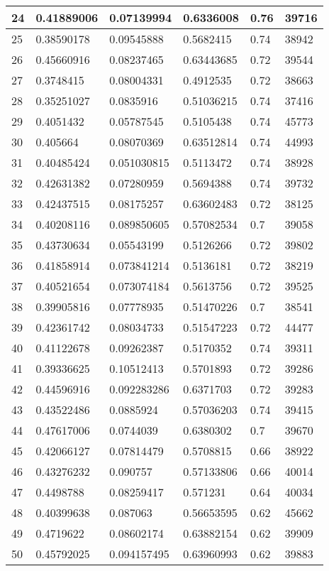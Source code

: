 \begin{longtable}{|l|l|l|l|l|l|}
24 & 0.41889006 & 0.07139994 & 0.6336008 & 0.76 & 39716 \\ \hline 
25 & 0.38590178 & 0.09545888 & 0.5682415 & 0.74 & 38942 \\ \hline 
26 & 0.45660916 & 0.08237465 & 0.63443685 & 0.72 & 39544 \\ \hline 
27 & 0.3748415 & 0.08004331 & 0.4912535 & 0.72 & 38663 \\ \hline 
28 & 0.35251027 & 0.0835916 & 0.51036215 & 0.74 & 37416 \\ \hline 
29 & 0.4051432 & 0.05787545 & 0.5105438 & 0.74 & 45773 \\ \hline 
30 & 0.405664 & 0.08070369 & 0.63512814 & 0.74 & 44993 \\ \hline 
31 & 0.40485424 & 0.051030815 & 0.5113472 & 0.74 & 38928 \\ \hline 
32 & 0.42631382 & 0.07280959 & 0.5694388 & 0.74 & 39732 \\ \hline 
33 & 0.42437515 & 0.08175257 & 0.63602483 & 0.72 & 38125 \\ \hline 
34 & 0.40208116 & 0.089850605 & 0.57082534 & 0.7 & 39058 \\ \hline 
35 & 0.43730634 & 0.05543199 & 0.5126266 & 0.72 & 39802 \\ \hline 
36 & 0.41858914 & 0.073841214 & 0.5136181 & 0.72 & 38219 \\ \hline 
37 & 0.40521654 & 0.073074184 & 0.5613756 & 0.72 & 39525 \\ \hline 
38 & 0.39905816 & 0.07778935 & 0.51470226 & 0.7 & 38541 \\ \hline 
39 & 0.42361742 & 0.08034733 & 0.51547223 & 0.72 & 44477 \\ \hline 
40 & 0.41122678 & 0.09262387 & 0.5170352 & 0.74 & 39311 \\ \hline 
41 & 0.39336625 & 0.10512413 & 0.5701893 & 0.72 & 39286 \\ \hline 
42 & 0.44596916 & 0.092283286 & 0.6371703 & 0.72 & 39283 \\ \hline 
43 & 0.43522486 & 0.0885924 & 0.57036203 & 0.74 & 39415 \\ \hline 
44 & 0.47617006 & 0.0744039 & 0.6380302 & 0.7 & 39670 \\ \hline 
45 & 0.42066127 & 0.07814479 & 0.5708815 & 0.66 & 38922 \\ \hline 
46 & 0.43276232 & 0.090757 & 0.57133806 & 0.66 & 40014 \\ \hline 
47 & 0.4498788 & 0.08259417 & 0.571231 & 0.64 & 40034 \\ \hline 
48 & 0.40399638 & 0.087063 & 0.56653595 & 0.62 & 45662 \\ \hline 
49 & 0.4719622 & 0.08602174 & 0.63882154 & 0.62 & 39909 \\ \hline 
50 & 0.45792025 & 0.094157495 & 0.63960993 & 0.62 & 39883 \\ \hline 
\end{longtable}